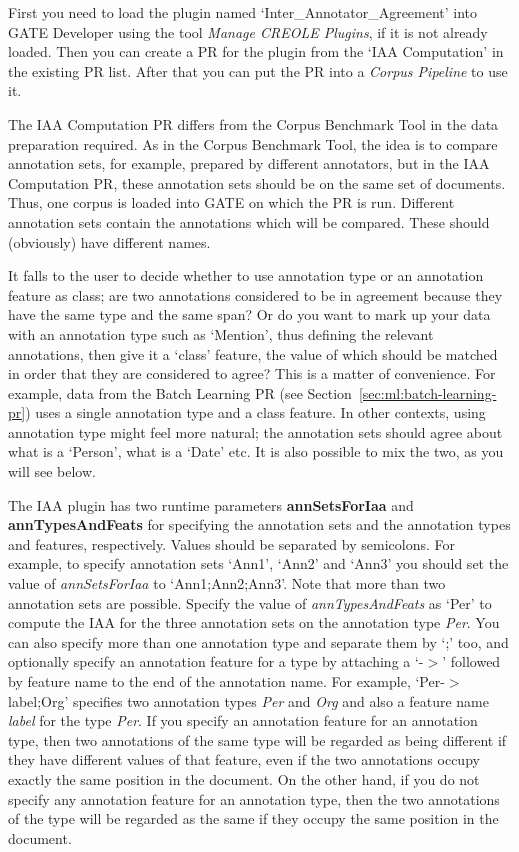 First you need to load the plugin named `Inter\_Annotator\_Agreement' into
GATE Developer using the tool {\em Manage CREOLE Plugins}, if it is not
already loaded.  Then you can create a PR for the plugin from the
`IAA Computation' in the existing PR list. After that you can put
the PR into a {\em Corpus Pipeline} to use it.

The IAA Computation PR differs from the Corpus Benchmark Tool in the data
preparation required. As in the Corpus Benchmark Tool, the idea is to compare
annotation sets, for example, prepared by different annotators, but in the IAA
Computation PR, these annotation sets should be on the same set of documents.
Thus, one corpus is loaded into GATE on which the PR is run. Different annotation
sets contain the annotations which will be compared. These should (obviously)
have different names.

It falls to the user to decide whether to use annotation type or an annotation
feature as class; are two annotations considered to be in agreement because they
have the same type and the same span? Or do you want to mark up your data with an
annotation type such as `Mention', thus defining the relevant annotations, then
give it a `class' feature, the value of which should be matched in order that
they are considered to agree? This is a matter of convenience. For example, data
from the Batch Learning PR (see Section~\ref {sec:ml:batch-learning-pr}) uses a
single annotation type and a class feature. In other contexts, using annotation
type might feel more natural; the annotation sets should agree about what is a
`Person', what is a `Date' etc. It is also possible to mix the two, as you will
see below.

The IAA plugin has two runtime parameters {\bf annSetsForIaa} and {\bf
annTypesAndFeats} for specifying the annotation sets and the annotation types and
features, respectively. Values should be separated by semicolons. For example, to
specify annotation sets `Ann1', `Ann2' and `Ann3' you should set the value of
{\em annSetsForIaa} to `Ann1;Ann2;Ann3'. Note that more than two annotation sets
are possible. Specify the value of {\em annTypesAndFeats} as `Per' to compute the
IAA for the three annotation sets on the annotation type {\em Per}. You can also
specify more than one annotation type and separate them by `;' too, and
optionally specify an annotation feature for a type by attaching a `-$>$'
followed by feature name to the end of the annotation name.  For example,
`Per-$>$label;Org' specifies two annotation types {\em Per} and {\em Org} and
also a feature name {\em label} for the type {\em Per}. If you specify an
annotation feature for an annotation type, then two annotations of the same type
will be regarded as being different if they have different values of that
feature, even if the two annotations occupy exactly the same position in the
document. On the other hand, if you do not specify any annotation feature for an
annotation type, then the two annotations of the type will be regarded as the
same if they occupy the same position in the document.

